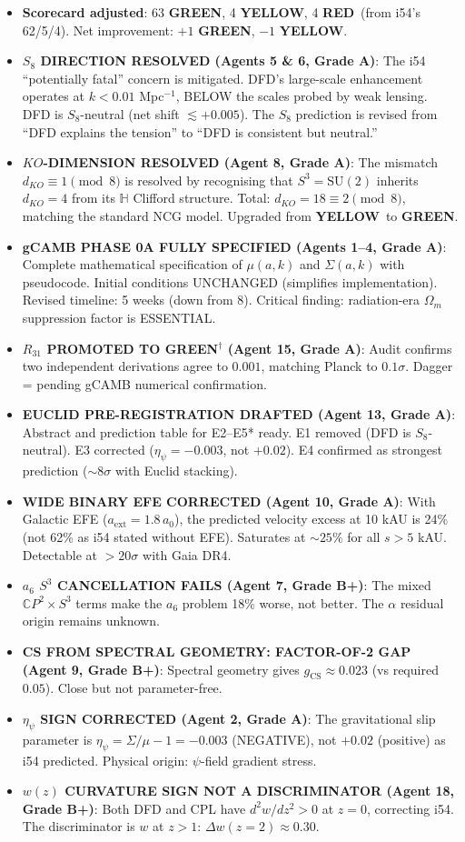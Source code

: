 \documentclass[11pt,a4paper]{article}
\newcommand{\GREEN}{\textcolor{dfdgreen}{\textbf{GREEN}}}
\newcommand{\YELLOW}{\textcolor{dfdyellow}{\textbf{YELLOW}}}
\newcommand{\RED}{\textcolor{dfdred}{\textbf{RED}}}
\newcommand{\CP}{\mathbb{C}P}
\begin{document}
\begin{itemize}
\item \textbf{Scorecard adjusted}: 63 \GREEN, 4 \YELLOW, 4 \RED\ (from i54's 62/5/4). Net improvement: $+1$ \GREEN, $-1$ \YELLOW.
\item \textbf{$S_8$ DIRECTION RESOLVED (Agents 5 \& 6, Grade A)}: The i54 ``potentially fatal'' concern is mitigated. DFD's large-scale enhancement operates at $k < 0.01$ Mpc$^{-1}$, BELOW the scales probed by weak lensing. DFD is $S_8$-neutral (net shift $\lesssim +0.005$). The $S_8$ prediction is revised from ``DFD explains the tension'' to ``DFD is consistent but neutral.''
\item \textbf{$KO$-DIMENSION RESOLVED (Agent 8, Grade A)}: The mismatch $d_{KO} \equiv 1 \pmod{8}$ is resolved by recognising that $S^3 = \mathrm{SU}(2)$ inherits $d_{KO} = 4$ from its $\mathbb{H}$ Clifford structure. Total: $d_{KO} = 18 \equiv 2 \pmod{8}$, matching the standard NCG model. Upgraded from \YELLOW\ to \GREEN.
\item \textbf{gCAMB PHASE 0A FULLY SPECIFIED (Agents 1--4, Grade A)}: Complete mathematical specification of $\mu(a,k)$ and $\Sigma(a,k)$ with pseudocode. Initial conditions UNCHANGED (simplifies implementation). Revised timeline: 5 weeks (down from 8). Critical finding: radiation-era $\Omega_m$ suppression factor is ESSENTIAL.
\item \textbf{$R_{31}$ PROMOTED TO GREEN$^\dagger$ (Agent 15, Grade A)}: Audit confirms two independent derivations agree to $0.001$, matching Planck to $0.1\sigma$. Dagger = pending gCAMB numerical confirmation.
\item \textbf{EUCLID PRE-REGISTRATION DRAFTED (Agent 13, Grade A)}: Abstract and prediction table for E2--E5* ready. E1 removed (DFD is $S_8$-neutral). E3 corrected ($\eta_\psi = -0.003$, not $+0.02$). E4 confirmed as strongest prediction ($\sim 8\sigma$ with Euclid stacking).
\item \textbf{WIDE BINARY EFE CORRECTED (Agent 10, Grade A)}: With Galactic EFE ($a_{\mathrm{ext}} = 1.8\,a_0$), the predicted velocity excess at 10 kAU is 24\% (not 62\% as i54 stated without EFE). Saturates at $\sim 25\%$ for all $s > 5$ kAU. Detectable at $> 20\sigma$ with Gaia DR4.
\item \textbf{$a_6$ $S^3$ CANCELLATION FAILS (Agent 7, Grade B+)}: The mixed $\CP^2 \times S^3$ terms make the $a_6$ problem 18\% worse, not better. The $\alpha$ residual origin remains unknown.
\item \textbf{CS FROM SPECTRAL GEOMETRY: FACTOR-OF-2 GAP (Agent 9, Grade B+)}: Spectral geometry gives $g_{\mathrm{CS}} \approx 0.023$ (vs required $0.05$). Close but not parameter-free.
\item \textbf{$\eta_\psi$ SIGN CORRECTED (Agent 2, Grade A)}: The gravitational slip parameter is $\eta_\psi = \Sigma/\mu - 1 = -0.003$ (NEGATIVE), not $+0.02$ (positive) as i54 predicted. Physical origin: $\psi$-field gradient stress.
\item \textbf{$w(z)$ CURVATURE SIGN NOT A DISCRIMINATOR (Agent 18, Grade B+)}: Both DFD and CPL have $d^2w/dz^2 > 0$ at $z = 0$, correcting i54. The discriminator is $w$ at $z > 1$: $\Delta w(z=2) \approx 0.30$.
\end{itemize}
\end{document}
